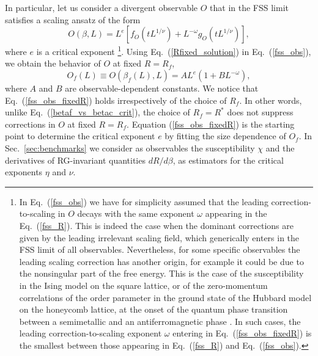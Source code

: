 \documentclass[pre,twocolumn]{revtex4-2}
\begin{document}
In particular, let us consider a divergent observable $O$ that in the FSS limit satisfies a scaling ansatz of the form
\begin{equation}
  O(\beta, L) = L^e\left[f_O(t L^{1/\nu}) + L^{-\omega}g_O(t L^{1/\nu})\right],
  \label{fss_obs}
\end{equation}
where $e$ is a critical exponent
\footnote{In Eq.~(\ref{fss_obs}) we have for simplicity assumed that the leading correction-to-scaling in $O$ decays with the same exponent $\omega$ appearing in the Eq.~(\ref{fss_R}).
This is indeed the case when the dominant corrections are given by the leading irrelevant scaling field, which generically enters in the FSS limit of all observables.
Nevertheless, for some specific observables the leading scaling correction has another origin, for example it could be due to the nonsingular part of the free energy.
This is the case of the susceptibility in the Ising model on the square lattice\cite{PV-02}, or of the zero-momentum correlations of the order parameter in the ground state of the Hubbard model on the honeycomb lattice, at the onset of the quantum phase transition between a semimetallic and an antiferromagnetic phase \cite{PTHAH-14}.
In such cases, the leading correction-to-scaling exponent $\omega$ entering in Eq.~(\ref{fss_obs_fixedR}) is the smallest between those appearing in Eq.~(\ref{fss_R}) and Eq.~(\ref{fss_obs}).}.
Using Eq.~(\ref{Rfixed_solution}) in Eq.~(\ref{fss_obs}), we obtain the behavior of $O$ at fixed $R=R_f$,
\begin{equation}
  O_f(L)\equiv O(\beta_f(L), L) = A L^e \left(1+BL^{-\omega}\right),
  \label{fss_obs_fixedR}
\end{equation}
where $A$ and $B$ are observable-dependent constants.
We notice that Eq.~(\ref{fss_obs_fixedR}) holds irrespectively of the choice of $R_f$.
In other words, unlike Eq.~(\ref{betaf_vs_betac_crit}), the choice of $R_f=R^*$ does not suppress corrections in $O$ at fixed $R=R_f$.
Equation (\ref{fss_obs_fixedR}) is the starting point to determine the critical exponent $e$ by fitting the size dependence of $O_f$.
In Sec.~\ref{sec:benchmarks} we consider as observables the susceptibility $\chi$ and the derivatives of RG-invariant quantities $dR/d\beta$, as estimators for the critical exponents $\eta$ and $\nu$.
\end{document}
